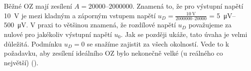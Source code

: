 \begin{mdframed}[style=mdexam]
  \begin{example}\label{aes:exam004}
    Běžné OZ mají zesílení \(A = \numrange{20000}{2000000}\). Znamená to, že pro výstupní napětí
    \qty{10}{\V} je mezi kladným a záporným vstupem napětí \(u_D
    =\frac{\qty{10}{\V}}{\numrange{2000000}{20000}}\) = \SIrange{5}{500}{\uV}. V praxi to většinou
    znamená, že rozdílové napětí \(u_D\) považujeme za nulové pro jakékoliv výstupní napětí \(u_0\).
    Jak se později ukáže, tato úvaha je velmi důležitá. Podmínku \(u_D = 0\) se snažíme zajistit za
    všech okolností. Vede to k požadavku, aby zesílení ideálního OZ bylo nekonečně velké (u reálného
    co největší) (\cite[s.~14]{Puncochar1996}).    
  \end{example}
\end{mdframed}